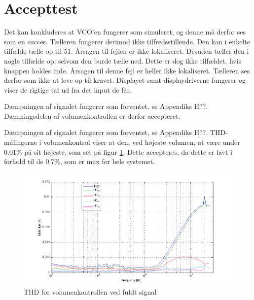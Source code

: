 \section{Accepttest}
\label{volumenkontrol-accepttest}
Det kan konkluderes at VCO'en fungerer som simuleret, og denne må derfor ses som en succes. Tælleren fungerer derimod ikke tilfredsstillende. Den kan i enkelte tilfælde tælle op til 51. Årsagen til fejlen er ikke lokaliseret. Desuden tæller den i nogle tilfælde op, selvom den burde tælle ned. Dette er dog ikke tilfældet, hvis knappen holdes inde. Årsagen til denne fejl er heller ikke lokaliseret. Tælleren ses derfor som ikke at leve op til kravet. Displayet samt displaydriverne fungerer og viser de rigtige tal ud fra det input de får.

Dæmpningen af signalet fungerer som forventet, se Appendiks H??. Dæmningsdelen af volumenkontrollen er derfor accepteret.

Dæmpningen af signalet fungerer som forventet, se Appendiks H??. THD-målingerne i volumenkontrol viser at den, ved højeste volumen, at være under 0.01\% på sit højeste, som set på figur \ref{fig:accvold:thd0}. Dette accepteres, da dette er lavt i forhold til de 0.7\%, som er max for hele systemet. 
\begin{figure}[h]
\centering
\includegraphics[width=\textwidth]{maalerapporter/volumenkontrol/2Vniveau0-thd.png}
\caption{THD for volumenkontrollen ved fuldt signal}
\label{fig:accvold:thd0}
\end{figure}

